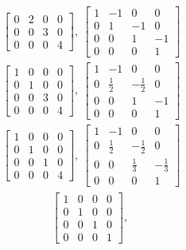 \documentclass[12pt]{article}
\begin{document}
\begin{enumerate}
\begin{align*}
\begin{bmatrix}
        0 & 2 & 0 & 0\\
        0 & 0 & 3 & 0\\
        0 & 0 & 0 & 4
      \end{bmatrix},\
      \begin{bmatrix}
        1 & -1 & 0 & 0\\
        0 & 1 & -1 & 0\\
        0 & 0 & 1 & -1\\
        0 & 0 & 0 & 1
      \end{bmatrix}
    \end{align*}
    \begin{align*}
      \begin{bmatrix}
        1 & 0 & 0 & 0\\
        0 & 1 & 0 & 0\\
        0 & 0 & 3 & 0\\
        0 & 0 & 0 & 4
      \end{bmatrix},\
      \begin{bmatrix}
        1 & -1 & 0 & 0\\
        0 & \frac{1}{2} & -\frac{1}{2} & 0\\
        0 & 0 & 1 & -1\\
        0 & 0 & 0 & 1
      \end{bmatrix}
    \end{align*}
    \begin{align*}
      \begin{bmatrix}
        1 & 0 & 0 & 0\\
        0 & 1 & 0 & 0\\
        0 & 0 & 1 & 0\\
        0 & 0 & 0 & 4
      \end{bmatrix},\
      \begin{bmatrix}
        1 & -1 & 0 & 0\\
        0 & \frac{1}{2} & -\frac{1}{2} & 0\\
        0 & 0 & \frac{1}{3} & -\frac{1}{3}\\
        0 & 0 & 0 & 1
      \end{bmatrix}
    \end{align*}
    \begin{align*}
      \begin{bmatrix}
        1 & 0 & 0 & 0\\
        0 & 1 & 0 & 0\\
        0 & 0 & 1 & 0\\
        0 & 0 & 0 & 1
      \end{bmatrix},\

\end{align*}
\end{enumerate}
\end{document}
